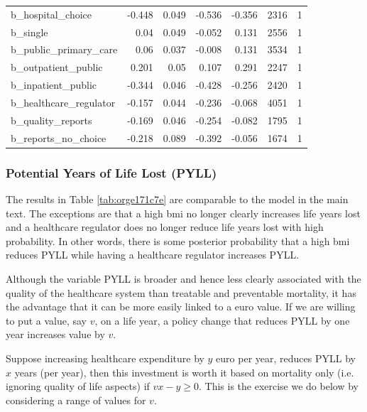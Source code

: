 \documentclass{article}
\begin{document}
\begin{table}[htbp]
\begin{tabular}{lrrrrrr}
b\_hospital\_choice & -0.448 & 0.049 & -0.536 & -0.356 & 2316 & 1\\
b\_single & 0.04 & 0.049 & -0.052 & 0.131 & 2556 & 1\\
b\_public\_primary\_care & 0.06 & 0.037 & -0.008 & 0.131 & 3534 & 1\\
b\_outpatient\_public & 0.201 & 0.05 & 0.107 & 0.291 & 2247 & 1\\
b\_inpatient\_public & -0.344 & 0.046 & -0.428 & -0.256 & 2420 & 1\\
b\_healthcare\_regulator & -0.157 & 0.044 & -0.236 & -0.068 & 4051 & 1\\
b\_quality\_reports & -0.169 & 0.046 & -0.254 & -0.082 & 1795 & 1\\
b\_reports\_no\_choice & -0.218 & 0.089 & -0.392 & -0.056 & 1674 & 1\\
\end{tabular}
\end{table}



\subsubsection{Potential Years of Life Lost (PYLL)}
\label{sec:orgce31dca}
\label{sec:PYLL}

The results in Table \ref{tab:orge171c7e} are comparable to the model in the main text. The exceptions are that a high bmi no longer clearly increases life years lost and a healthcare regulator does no longer reduce life years lost with high probability. In other words, there is some posterior probability that a high bmi reduces PYLL while having a healthcare regulator increases PYLL.

Although the variable PYLL is broader and hence less clearly associated with the quality of the healthcare system than treatable and preventable mortality, it has the advantage that it can be more easily linked to a euro value. If we are willing to put a value, say \(v\), on a life year, a policy change that reduces PYLL by one year increases value by \(v\). 

Suppose increasing healthcare expenditure by \(y\) euro per year, reduces PYLL by \(x\) years (per year), then this investment is worth it based on mortality only (i.e. ignoring quality of life aspects) if \(v x - y \geq 0\). This is the exercise we do below by considering a range of values for \(v\).
\end{document}
